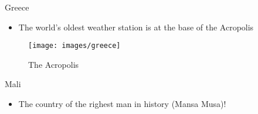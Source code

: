 \documentclass[
  ignorenonframetext,
]{beamer}
\providecommand{\tightlist}{%
  \setlength{\itemsep}{0pt}\setlength{\parskip}{0pt}}
\begin{document}
\begin{frame}{Greece}
\protect\hypertarget{greece}{}
\begin{itemize}
\tightlist
\item
  The world's oldest weather station is at the base of the Acropolis
\end{itemize}

\begin{figure}

{\centering \texttt{[image: images/greece]} 

}

\caption{The Acropolis}\label{fig:unnamed-chunk-11}
\end{figure}
\end{frame}

\begin{frame}{Mali}
\protect\hypertarget{mali}{}
\begin{itemize}
\tightlist
\item
  The country of the righest man in history (Mansa Musa)!
\end{itemize}
\end{frame}

\hypertarget{section}{%
\section{}\label{section}}
\end{document}
